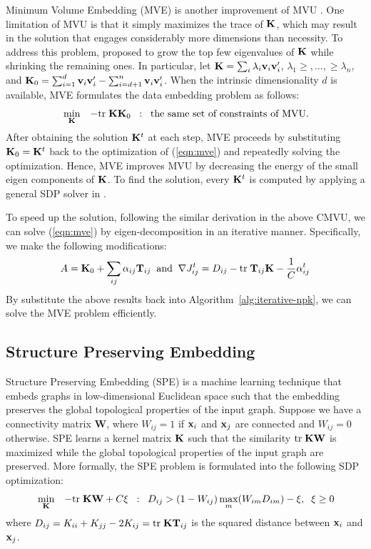 Minimum Volume Embedding (MVE) is another improvement of MVU
\cite{aistats/ShawJ07}. One limitation of MVU is that it simply maximizes the trace
of ${\bf K}$, which may result in the solution that engages considerably more dimensions
than necessity. To address this problem,
\cite{aistats/ShawJ07} proposed to grow the top few eigenvalues of ${\bf K}$ while shrinking the remaining ones. In particular, let ${\bf K} = \sum_i \lambda_i \mathbf v_i \mathbf v_i'$, $\lambda_1 \geq, \ldots, \geq \lambda_n$, and ${\bf K}_0 = \sum_{i=1}^d \mathbf v_i \mathbf v_i' - \sum_{i=d+1}^n \mathbf v_i \mathbf v_i'$. When the intrinsic dimensionality $d$ is available, MVE formulates the data embedding problem as follows:
\begin{eqnarray}
&\min_{\K}& - \tr\K\K_0 \;\;:\;\; \mbox{the same set of constraints of MVU}. \label{eqn:mve}
\end{eqnarray}
After obtaining the solution ${\bf K}^t$ at each step, MVE proceeds by substituting ${\bf K}_0 = {\bf K}^t$ back to the optimization of (\ref{eqn:mve}) and repeatedly solving the optimization. Hence, MVE improves MVU by decreasing the energy of the small eigen components of ${\bf K}$. To find the solution, every ${\bf K}^t$ is computed by applying a general SDP solver in \cite{aistats/ShawJ07}.

To speed up the solution, following the similar derivation in the above CMVU, we can solve (\ref{eqn:mve}) by eigen-decomposition in an iterative manner. Specifically, we make the following modifications:
\[
A = {\bf K}_0 + \sum_{ij}{\alpha}_{ij}{\bf T}_{ij} \;\;\mbox{and}\;\; \nabla J^t_{ij} = D_{ij} - {\mbox{tr}\;}{\bf T}_{ij}{\bf K} -\frac{1}{C}{\alpha}_{ij}^t
\]
By substitute the above results back into Algorithm~\ref{alg:iterative-npk}, we can solve the MVE problem efficiently.

\subsection{Structure Preserving Embedding} \label{sec:spe}

Structure Preserving Embedding (SPE) \cite{icml/ShawJ09} is a machine learning
technique that embeds graphs in low-dimensional Euclidean space such that the
embedding preserves the global topological properties of the input graph. Suppose we
have a connectivity matrix $\mathbf W$, where $W_{ij} = 1$ if ${\bf x}_i$ and ${\bf x}_j$ are
connected and $W_{ij} = 0$ otherwise. SPE learns a kernel matrix ${\bf K}$ such that the
similarity ${\mbox{tr}\;}{\bf K} \mathbf W$ is maximized while the global topological properties of
the input graph are preserved. More formally, the SPE problem is formulated into the
following SDP optimization:
\begin{eqnarray}
&\min_{\bf K}& -{\mbox{tr}\;}{\bf K} \mathbf W + C \xi \;\;:\;\; D_{ij} > (1 - W_{ij})\max_m(W_{im}D_{im}) - \xi,\;\;\xi \geq 0 \nonumber
\end{eqnarray}
where $D_{ij} = K_{ii} + K_{jj} - 2K_{ij} = {\mbox{tr}\;}{\bf K} {\bf T}_{ij}$ is the squared distance
between ${\bf x}_i$ and ${\bf x}_j$.

